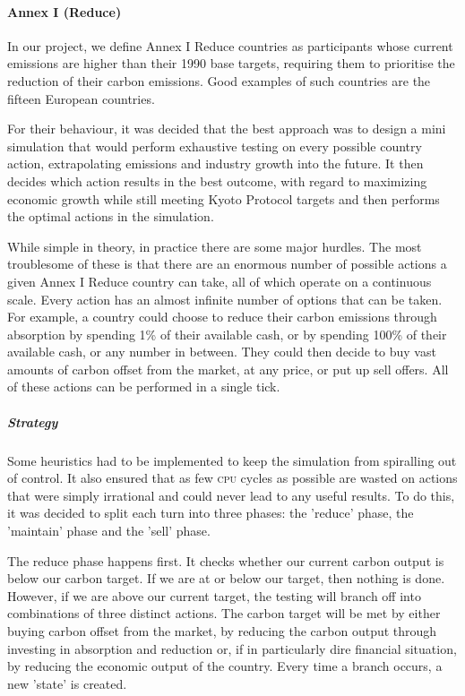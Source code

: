 \paragraph{Annex I (Reduce)}

In our project, we define Annex I Reduce countries as participants whose current emissions are higher than their 1990 base targets, requiring them to prioritise the reduction of their carbon emissions. Good examples of such countries are the fifteen European countries.

For their behaviour, it was decided that the best approach was to design a mini simulation that would perform exhaustive testing on every possible country action, extrapolating emissions and industry growth into the future. It then decides which action results in the best outcome, with regard to maximizing economic growth while still meeting Kyoto Protocol targets and then performs the optimal actions in the simulation.

While simple in theory, in practice there are some major hurdles. The most troublesome of these is that there are an enormous number of possible actions a given Annex I Reduce country can take, all of which operate on a continuous scale. Every action has an almost infinite number of options that can be taken. For example, a country could choose to reduce their carbon emissions through absorption by spending 1\% of their available cash, or by spending 100\% of their available cash, or any number in between. They could then decide to buy vast amounts of carbon offset from the market, at any price, or put up sell offers. All of these actions can be performed in a single tick.

\subparagraph{Strategy}

Some heuristics had to be implemented to keep the simulation from spiralling out of control. It also ensured that as few \textsc{cpu} cycles as possible are wasted on actions that were simply irrational and could never lead to any useful results. To do this, it was decided to split each turn into three phases: the 'reduce' phase, the 'maintain' phase and the 'sell' phase.

The reduce phase happens first. It checks whether our current carbon output is below our carbon target. If we are at or below our target, then nothing is done. However, if we are above our current target, the testing will branch off into combinations of three distinct actions. The carbon target will be met by either buying carbon offset from the market, by reducing the carbon output through investing in absorption and reduction or, if in particularly dire financial situation, by reducing the economic output of the country. Every time a branch occurs, a new 'state' is created.

